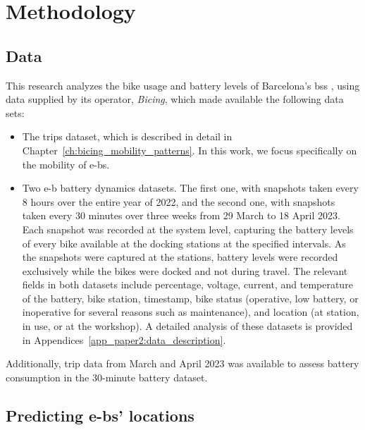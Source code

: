 \section{Methodology}
\label{sec:battery_methodology}

    \subsection{Data}

    This research analyzes the bike usage and battery levels of Barcelona's \ac{bss} \cite{Soriguera2018, Winslow2019, Grau-Escolano2024}, using data supplied by its operator, \textit{Bicing}, which made available the following data sets:

      \begin{itemize}
        \item The trips dataset, which is described in detail in Chapter~\ref{ch:bicing_mobility_patterns}. In this work, we focus specifically on the mobility of \acp{e-b}.

        \item Two \ac{e-b} battery dynamics datasets. The first one, with snapshots taken every 8 hours over the entire year of 2022, and the second one, with snapshots taken every 30 minutes over three weeks from 29 March to 18 April 2023. Each snapshot was recorded at the system level, capturing the battery levels of every bike available at the docking stations at the specified intervals. As the snapshots were captured at the stations, battery levels were recorded exclusively while the bikes were docked and not during travel. The relevant fields in both datasets include percentage, voltage, current, and temperature of the battery, bike station, timestamp, bike status (operative, low battery, or inoperative for several reasons such as maintenance), and location (at station, in use, or at the workshop). A detailed analysis of these datasets is provided in Appendices~\ref{app_paper2:data_description}.
      \end{itemize}

    Additionally, trip data from March and April 2023 was available to assess battery consumption in the 30-minute battery dataset.



    \subsection[Predicting e-bikes' locations]{Predicting \acp{e-b}' locations}

